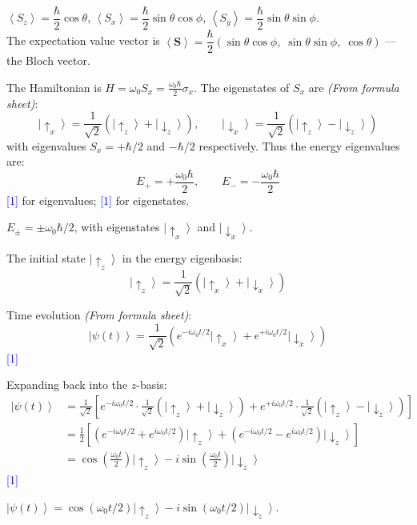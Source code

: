 \documentclass[12pt,a4paper]{article}
\newcommand{\markstep}[1]{\hfill\textcolor{blue}{[#1]}}
\newcommand{\finalanswer}[1]{%
  \begin{tcolorbox}[colback=green!5!white,colframe=green!50!black,boxrule=0.5pt]
  #1
  \end{tcolorbox}
}
\newcommand{\fromsheet}{\textit{(From formula sheet)}}
\renewcommand{\ket}[1]{\left|#1\right\rangle}
\renewcommand{\expect}[1]{\left\langle #1\right\rangle}
\begin{document}
\begin{parts}
\begin{parts}
\finalanswer{$\expect{S_z} = \dfrac{\hbar}{2}\cos\theta$, \quad $\expect{S_x} = \dfrac{\hbar}{2}\sin\theta\cos\phi$, \quad $\expect{S_y} = \dfrac{\hbar}{2}\sin\theta\sin\phi$.\\[4pt]
The expectation value vector is $\expect{\mathbf{S}} = \dfrac{\hbar}{2}(\sin\theta\cos\phi,\;\sin\theta\sin\phi,\;\cos\theta)$ --- the Bloch vector.}
\end{parts}

\item
\begin{parts}
\item The Hamiltonian is $H = \omega_0 S_x = \frac{\omega_0\hbar}{2}\sigma_x$. The eigenstates of $S_x$ are \fromsheet:
\[
\ket{\!\uparrow_x} = \frac{1}{\sqrt{2}}(\ket{\!\uparrow_z} + \ket{\!\downarrow_z}), \qquad \ket{\!\downarrow_x} = \frac{1}{\sqrt{2}}(\ket{\!\uparrow_z} - \ket{\!\downarrow_z})
\]
with eigenvalues $S_x = +\hbar/2$ and $-\hbar/2$ respectively. Thus the energy eigenvalues are:
\[
E_+ = +\frac{\omega_0\hbar}{2}, \qquad E_- = -\frac{\omega_0\hbar}{2}
\]
\markstep{1} for eigenvalues; \markstep{1} for eigenstates.

\finalanswer{$E_\pm = \pm\omega_0\hbar/2$, with eigenstates $\ket{\!\uparrow_x}$ and $\ket{\!\downarrow_x}$.}

\item The initial state $\ket{\!\uparrow_z}$ in the energy eigenbasis:
\[
\ket{\!\uparrow_z} = \frac{1}{\sqrt{2}}\left(\ket{\!\uparrow_x} + \ket{\!\downarrow_x}\right)
\]

Time evolution \fromsheet:
\[
\ket{\psi(t)} = \frac{1}{\sqrt{2}}\left(e^{-i\omega_0 t/2}\ket{\!\uparrow_x} + e^{+i\omega_0 t/2}\ket{\!\downarrow_x}\right)
\]
\markstep{1}

Expanding back into the $z$-basis:
\begin{align*}
\ket{\psi(t)} &= \frac{1}{\sqrt{2}}\left[e^{-i\omega_0 t/2}\cdot\frac{1}{\sqrt{2}}(\ket{\!\uparrow_z}+\ket{\!\downarrow_z}) + e^{+i\omega_0 t/2}\cdot\frac{1}{\sqrt{2}}(\ket{\!\uparrow_z}-\ket{\!\downarrow_z})\right]\\
&= \frac{1}{2}\left[(e^{-i\omega_0 t/2}+e^{i\omega_0 t/2})\ket{\!\uparrow_z} + (e^{-i\omega_0 t/2}-e^{i\omega_0 t/2})\ket{\!\downarrow_z}\right]\\
&= \cos\!\left(\frac{\omega_0 t}{2}\right)\ket{\!\uparrow_z} - i\sin\!\left(\frac{\omega_0 t}{2}\right)\ket{\!\downarrow_z}
\end{align*}
\markstep{1}

\finalanswer{$\ket{\psi(t)} = \cos(\omega_0 t/2)\ket{\!\uparrow_z} - i\sin(\omega_0 t/2)\ket{\!\downarrow_z}$.}
\end{parts}


\end{parts}
\end{document}

